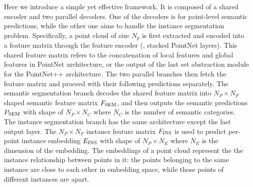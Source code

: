 \documentclass[10pt,twocolumn,letterpaper]{article}
\begin{document}
Here we introduce a simple yet effective framework.
It is composed of a shared encoder and two parallel decoders.
One of the decoders is for point-level semantic predictions, while the other one aims to handle the instance segmentation problem. 
Specifically, a point cloud of size $N_p$ is first extracted and encoded  into a feature matrix through the feature encoder (\eg, stacked PointNet layers). 
This shared feature matrix refers to the concatenation of local features and global features in PointNet architecture, or the output of the last set abstraction module for the PointNet++ architecture.
The two parallel branches then fetch the feature matrix and proceed with their following predictions separately.
The semantic segmentation branch decodes the shared feature matrix into $N_P \times N_{F}$ shaped  semantic feature matrix $F_{\rm SEM}$, and then outputs the semantic predictions $P_{\rm SEM}$ with shape of $N_P \times N_C$ where $N_C$ is the number of semantic categories. 
The instance segmentation branch has the same architecture except the last output layer.
The $N_P \times N_{F}$ instance feature matrix $F_{\rm INS}$ is used to predict per-point instance embedding $E_{\rm INS}$ with shape of $N_P \times N_{E}$ where $N_{E}$ is the dimension of the embedding.
The embeddings of a point cloud represent the the instance relationship between points in it: the points belonging to the same instance are close to each other in embedding space, while those points of different instances are apart. 
\end{document}
